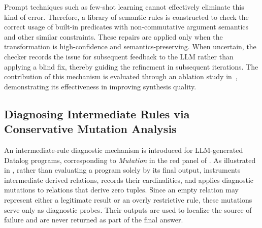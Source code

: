 Prompt techniques such as few-shot learning cannot effectively eliminate this kind of error.
Therefore, a library of semantic rules is constructed to check the correct usage of built-in
predicates with non-commutative argument semantics and other similar constraints.
These repairs are applied only when the transformation is high-confidence and semantics-preserving.
When uncertain, the checker records the issue for subsequent feedback to the LLM rather than
applying a blind fix, thereby guiding the refinement in subsequent iterations.
The contribution of this mechanism is evaluated through an ablation study in~, demonstrating its effectiveness in improving synthesis quality.

\subsection{Diagnosing Intermediate Rules via Conservative Mutation Analysis}
\label{sec:method:int-dataloc}

An intermediate-rule diagnostic mechanism is introduced for LLM-generated Datalog programs, corresponding to \textit{Mutation} in the red panel of . As
illustrated in , rather than evaluating a program solely by its final output,
\tooldataloc instruments intermediate derived relations, records their cardinalities, and applies
diagnostic mutations to relations that derive zero tuples. Since an empty relation may represent
either a legitimate result or an overly restrictive rule, these mutations serve only as diagnostic
probes. Their outputs are used to localize the source of failure and are never returned as part of
the final answer.

